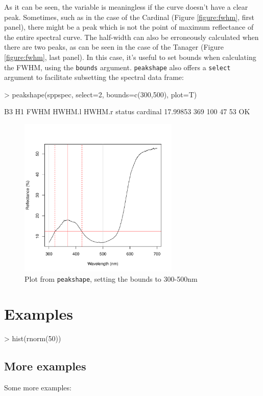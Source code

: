\documentclass{article}
\newcommand{\code}[1]{{\tt #1}}  %
\begin{document}
\clearpage{}

As it can be seen, the variable is meaningless if the curve doesn't have a clear peak. Sometimes, such as in the case of the Cardinal (Figure \ref{figure:fwhm}, first panel), there might be a peak which is not the point of maximum reflectance of the entire spectral curve. The half-width can also be erroneously calculated when there are two peaks, as can be seen in the case of the Tanager (Figure \ref{figure:fwhm}, last panel). In this case, it's useful to set bounds when calculating the FWHM, using the \code{bounds} argument. \code{peakshape} also offers a \code{select} argument to facilitate subsetting the spectral data frame:

\begin{Schunk}
\begin{Sinput}
> peakshape(sppspec, select=2, bounds=c(300,500), plot=T)
\end{Sinput}
\begin{Soutput}
               B3  H1 FWHM HWHM.l HWHM.r status
cardinal 17.99853 369  100     47     53     OK
\end{Soutput}
\end{Schunk}

\begin{figure}[h] %
\begin{center}
\includegraphics[width=3in, height=3in]{pavo-fwhm2}
\end{center}
\caption{Plot from \code{peakshape}, setting the bounds to 300-500nm}
\label{igure:fwhm2}
\end{figure}

\clearpage{}

\section*{Examples}


\begin{Schunk}
\begin{Sinput}
> hist(rnorm(50))
\end{Sinput}
\end{Schunk}


\subsection*{More examples}

Some more examples:


\end{document}
